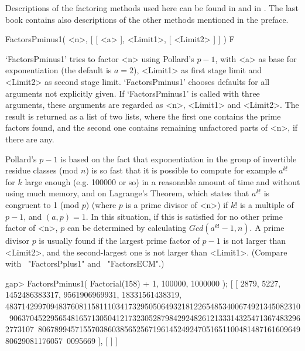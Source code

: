 

Descriptions of the factoring methods used here can be found in
\cite{FactorizationAndPrimalityTesting} and in
\cite{ComputationalAlgebraicNumberTheory}.
The last book contains also descriptions of the other methods mentioned
in the preface.

 
\>FactorsPminus1( <n>, [ [ <a> ], <Limit1>, [ <Limit2> ] ] ) F

`FactorsPminus1' tries to factor <n> using Pollard's $p-1$, with <a>
as base for exponentiation (the default is $a=2$), 
<Limit1> as first stage limit and <Limit2> as second stage limit.
`FactorsPminus1' chooses defaults for all arguments not explicitly given.
If `FactorsPminus1' is called with three arguments, these arguments
are regarded as <n>, <Limit1> and <Limit2>.
The result is returned as a list of two lists, where the first one 
contains the prime factors found, and the second one contains
remaining unfactored parts of <n>, if there are any.

Pollard's $p-1$ is based on the fact that exponentiation in the
group of invertible residue classes (mod $n$) is so fast that
it is possible to compute for example $a^{k!}$ for $k$ large enough
(e.g. 100000 or so) in a reasonable amount of time and without
using much memory, and on 
Lagrange's Theorem,
which states that $a^{k!}$ is congruent to 1 (mod $p$) 
(where $p$ is a prime divisor of <n>) if $k!$ is a multiple of $p-1$,
and $(a,p)=1$.
In this situation, if this is satisfied for no other
prime factor of <n>, $p$ can be determined by 
calculating $Gcd(a^{k!}-1,n)$.
A prime divisor $p$ is usually found if the largest prime factor
of $p-1$ is not larger than <Limit2>, and the second-largest one
is not larger than <Limit1>.
(Compare with ~"FactorsPplus1" and ~"FactorsECM".)

\beginexample
gap> FactorsPminus1( Factorial(158) + 1, 100000, 1000000 );
[ [ 2879, 5227, 1452486383317, 9561906969931, 18331561438319, 
      483714299709483760811581110341732950506493218122654853400674921345082310\
906370452295654816571305041217323052879842924826121333143254713674832962773107\
806789945715570386038565256719614524924705165110048148716160964980629081176057\
0095669 ], [  ] ]

